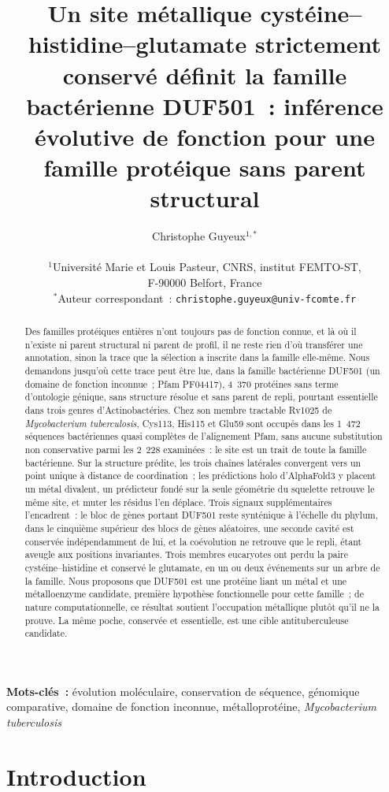 \documentclass[11pt,a4paper]{article}
\title{Un site métallique cystéine--histidine--glutamate strictement conservé définit la famille bactérienne DUF501~: inférence évolutive de fonction pour une famille protéique sans parent structural}
\author{Christophe Guyeux$^{1,*}$\\[6pt]
  \parbox{\textwidth}{\centering\small
    $^{1}$Universit\'e Marie et Louis Pasteur, CNRS, institut FEMTO-ST,\\
    F-90000 Belfort, France\\[3pt]
    $^{*}$Auteur correspondant~: \texttt{christophe.guyeux@univ-fcomte.fr}
  }
}
\date{}
\newcommand{\mtb}{\textit{Mycobacterium tuberculosis}}
\begin{document}
\linenumbers
\maketitle

\begin{abstract}
\noindent
Des familles protéiques entières n'ont toujours pas de fonction connue, et là où il n'existe ni parent structural ni parent de profil, il ne reste rien d'où transférer une annotation, sinon la trace que la sélection a inscrite dans la famille elle-même. Nous demandons jusqu'où cette trace peut être lue, dans la famille bactérienne DUF501 (un domaine de fonction inconnue~; Pfam PF04417), 4~370 protéines sans terme d'ontologie génique, sans structure résolue et sans parent de repli, pourtant essentielle dans trois genres d'Actinobactéries. Chez son membre tractable Rv1025 de \mtb{}, Cys113, His115 et Glu59 sont occupés dans les 1~472 séquences bactériennes quasi complètes de l'alignement Pfam, sans aucune substitution non conservative parmi les 2~228 examinées~: le site est un trait de toute la famille bactérienne. Sur la structure prédite, les trois chaînes latérales convergent vers un point unique à distance de coordination~; les prédictions holo d'AlphaFold3 y placent un métal divalent, un prédicteur fondé sur la seule géométrie du squelette retrouve le même site, et muter les résidus l'en déplace. Trois signaux supplémentaires l'encadrent~: le bloc de gènes portant DUF501 reste synténique à l'échelle du phylum, dans le cinquième supérieur des blocs de gènes aléatoires, une seconde cavité est conservée indépendamment de lui, et la coévolution ne retrouve que le repli, étant aveugle aux positions invariantes. Trois membres eucaryotes ont perdu la paire cystéine--histidine et conservé le glutamate, en un ou deux événements sur un arbre de la famille. Nous proposons que DUF501 est une protéine liant un métal et une métalloenzyme candidate, première hypothèse fonctionnelle pour cette famille~; de nature computationnelle, ce résultat soutient l'occupation métallique plutôt qu'il ne la prouve. La même poche, conservée et essentielle, est une cible antituberculeuse candidate.
\end{abstract}

\textbf{Mots-clés~:} évolution moléculaire, conservation de séquence, génomique comparative, domaine de fonction inconnue, métalloprotéine, \textit{Mycobacterium tuberculosis}

\section{Introduction}
\end{document}
